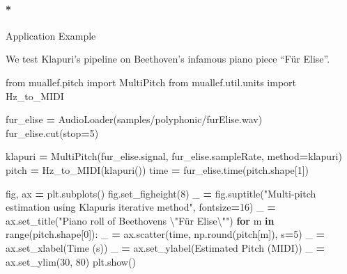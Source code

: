 \documentclass[
  american,
]{article}
\newenvironment{Shaded}{\begin{snugshade}}{\end{snugshade}}
\newcommand{\BuiltInTok}[1]{#1}
\newcommand{\CharTok}[1]{\textcolor[rgb]{0.31,0.60,0.02}{#1}}
\newcommand{\ControlFlowTok}[1]{\textcolor[rgb]{0.13,0.29,0.53}{\textbf{#1}}}
\newcommand{\DecValTok}[1]{\textcolor[rgb]{0.00,0.00,0.81}{#1}}
\newcommand{\ImportTok}[1]{#1}
\newcommand{\KeywordTok}[1]{\textcolor[rgb]{0.13,0.29,0.53}{\textbf{#1}}}
\newcommand{\NormalTok}[1]{#1}
\newcommand{\OperatorTok}[1]{\textcolor[rgb]{0.81,0.36,0.00}{\textbf{#1}}}
\newcommand{\StringTok}[1]{\textcolor[rgb]{0.31,0.60,0.02}{#1}}
\let\oldparagraph\paragraph
\renewcommand{\paragraph}[1]{\oldparagraph*{#1}}
\begin{document}
\hypertarget{application-example-1}{%
\paragraph*{Application Example}\label{application-example-1}}

We test Klapuri's pipeline on Beethoven's infamous piano
piece ``Für Elise''.

\begin{Shaded}
\begin{Highlighting}[]
\ImportTok{from}\NormalTok{ muallef.pitch }\ImportTok{import}\NormalTok{ MultiPitch}
\ImportTok{from}\NormalTok{ muallef.util.units }\ImportTok{import}\NormalTok{ Hz\_to\_MIDI}

\NormalTok{fur\_elise }\OperatorTok{=}\NormalTok{ AudioLoader(}\StringTok{\textquotesingle{}samples/polyphonic/furElise.wav\textquotesingle{}}\NormalTok{)}
\NormalTok{fur\_elise.cut(stop}\OperatorTok{=}\DecValTok{5}\NormalTok{)}

\NormalTok{klapuri }\OperatorTok{=}\NormalTok{ MultiPitch(fur\_elise.signal, fur\_elise.sampleRate, method}\OperatorTok{=}\StringTok{\textquotesingle{}klapuri\textquotesingle{}}\NormalTok{)}
\NormalTok{pitch }\OperatorTok{=}\NormalTok{ Hz\_to\_MIDI(klapuri())}
\NormalTok{time }\OperatorTok{=}\NormalTok{ fur\_elise.time(pitch.shape[}\DecValTok{1}\NormalTok{])}

\NormalTok{fig, ax }\OperatorTok{=}\NormalTok{ plt.subplots()}
\NormalTok{fig.set\_figheight(}\DecValTok{8}\NormalTok{)}
\NormalTok{\_ }\OperatorTok{=}\NormalTok{ fig.suptitle(}\StringTok{"Multi{-}pitch estimation using Klapuri\textquotesingle{}s iterative method"}\NormalTok{, fontsize}\OperatorTok{=}\DecValTok{16}\NormalTok{)}
\NormalTok{\_ }\OperatorTok{=}\NormalTok{ ax.set\_title(}\StringTok{"Piano roll of Beethoven\textquotesingle{}s }\CharTok{\textbackslash{}"}\StringTok{Für Elise}\CharTok{\textbackslash{}"}\StringTok{"}\NormalTok{)}
\ControlFlowTok{for}\NormalTok{ m }\KeywordTok{in} \BuiltInTok{range}\NormalTok{(pitch.shape[}\DecValTok{0}\NormalTok{]):}
\NormalTok{    \_ }\OperatorTok{=}\NormalTok{ ax.scatter(time, np.}\BuiltInTok{round}\NormalTok{(pitch[m]), s}\OperatorTok{=}\DecValTok{5}\NormalTok{)}
\NormalTok{\_ }\OperatorTok{=}\NormalTok{ ax.set\_xlabel(}\StringTok{\textquotesingle{}Time (s)\textquotesingle{}}\NormalTok{)}
\NormalTok{\_ }\OperatorTok{=}\NormalTok{ ax.set\_ylabel(}\StringTok{\textquotesingle{}Estimated Pitch (MIDI)\textquotesingle{}}\NormalTok{)}
\NormalTok{\_ }\OperatorTok{=}\NormalTok{ ax.set\_ylim(}\DecValTok{30}\NormalTok{, }\DecValTok{80}\NormalTok{)}
\NormalTok{plt.show()}
\end{Highlighting}
\end{Shaded}
\end{document}
